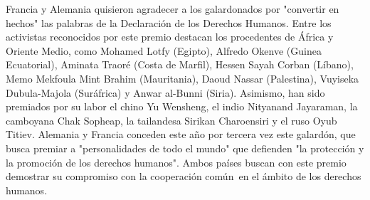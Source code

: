 \documentclass{article}%
\begin{document}
Francia y Alemania quisieron agradecer a los galardonados por "convertir en hechos" las palabras de la Declaración de los Derechos Humanos.%
\newline%
%
Entre los activistas reconocidos por este premio destacan los procedentes de África y Oriente Medio, como Mohamed Lotfy (Egipto), Alfredo Okenve (Guinea Ecuatorial), Aminata Traoré (Costa de Marfil), Hessen Sayah Corban (Líbano), Memo Mekfoula Mint Brahim (Mauritania), Daoud Nassar (Palestina), Vuyiseka Dubula{-}Majola (Suráfrica) y Anwar al{-}Bunni (Siria).%
\newline%
%
Asimismo, han sido premiados por su labor el chino Yu Wensheng, el indio Nityanand Jayaraman, la camboyana Chak Sopheap, la tailandesa Sirikan Charoensiri y el ruso Oyub Titiev.%
\newline%
%
Alemania y Francia conceden este año por tercera vez este galardón, que busca premiar a "personalidades de todo el mundo" que defienden "la protección y la promoción de los derechos humanos".%
\newline%
%
Ambos países buscan con este premio demostrar su compromiso con la cooperación común~en el ámbito de los derechos humanos.%
\newline%
%
\end{document}
